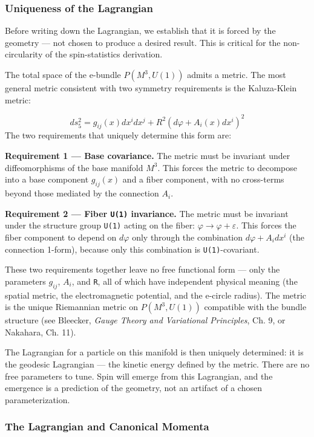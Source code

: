 \documentclass[aps,prd,preprint,superscriptaddress,longbibliography,floatfix]{revtex4-2}
\theoremstyle{remark}
\begin{document}
\subsubsection{Uniqueness of the Lagrangian}

Before writing down the Lagrangian, we establish that it is forced by the geometry --- not chosen to produce a desired result. This is critical for the non-circularity of the spin-statistics derivation.

The total space of the e-bundle $P(M^{3}, U(1))$ admits a metric. The most general metric consistent with two symmetry requirements is the Kaluza-Klein metric:


\begin{equation}
    ds_{5}^{2} = g_{ij}(x) dx^i dx^j + R^{2} (d\varphi + A_i(x) dx^i)^{2}
\end{equation}
The two requirements that uniquely determine this form are:

\textbf{Requirement 1 --- Base covariance.} The metric must be invariant under diffeomorphisms of the base manifold $M^{3}$. This forces the metric to decompose into a base component $g_{ij}(x)$ and a fiber component, with no cross-terms beyond those mediated by the connection $A_i$.

\textbf{Requirement 2 --- Fiber \texttt{U(1)} invariance.} The metric must be invariant under the structure group \texttt{U(1)} acting on the fiber: $\varphi \to \varphi + \varepsilon$. This forces the fiber component to depend on $d\varphi$ only through the combination $d\varphi + A_i dx^i$ (the connection 1-form), because only this combination is \texttt{U(1)}-covariant.

These two requirements together leave no free functional form --- only the parameters $g_{ij}$, $A_i$, and \texttt{R}, all of which have independent physical meaning (the spatial metric, the electromagnetic potential, and the e-circle radius). The metric is the unique Riemannian metric on $P(M^{3}, U(1))$ compatible with the bundle structure (see Bleecker, \textit{Gauge Theory and Variational Principles}, Ch. 9, or Nakahara, Ch. 11).

The Lagrangian for a particle on this manifold is then uniquely determined: it is the geodesic Lagrangian --- the kinetic energy defined by the metric. There are no free parameters to tune. Spin will emerge from this Lagrangian, and the emergence is a prediction of the geometry, not an artifact of a chosen parameterization.


\subsubsection{The Lagrangian and Canonical Momenta}
\end{document}
